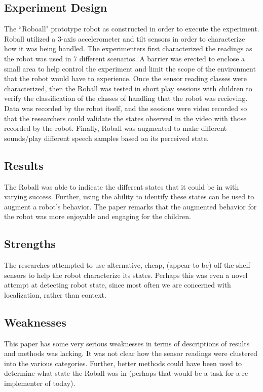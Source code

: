\documentclass{article}
\begin{document}
\subsection{Experiment Design}
The ``Roboall" prototype robot as constructed in order to execute the experiment. Roball utilized a 3-axis accelerometer and tilt sensors in order to characterize how it was being handled. The experimenters first characterized the readings as the robot was used in 7 different scenarios. A barrier was erected to enclose a small area to help control the experiment and limit the scope of the environment that the robot would have to experience.
Once the sensor reading classes were characterized, then the Roball was tested in short play sessions with children to verify the classification of the classes of handling that the robot was recieving. Data was recorded by the robot itself, and the sessions were video recorded so that the researchers could validate the states observed in the video with those recorded by the robot.
Finally, Roball was augmented to make different sounds/play different speech samples based on its perceived state.

\subsection{Results}
The Roball was able to indicate the different states that it could be in with varying success. Further, using the ability to identify these states can be used to augment a robot's behavior. The paper remarks that the augmented behavior for the robot was more enjoyable and engaging for the children.

\subsection{Strengths}
The researches attempted to use alternative, cheap, (appear to be) off-the-shelf sensors to help the robot characterize its states. Perhaps this was even a novel attempt at detecting robot state, since most often we are concerned with localization, rather than context.

\subsection{Weaknesses}
This paper has some very serious weaknesses in terms of descriptions of results and methods was lacking. It was not clear how the sensor readings were clustered into the various categories. Further, better methods could have been used to determine what state the Roball was in (perhaps that would be a task for a re-implementer of today).
\end{document}
